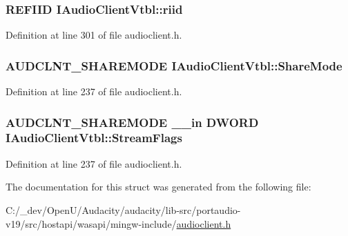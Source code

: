 \subsubsection[{\texorpdfstring{riid}{riid}}]{ {\bf R\+E\+F\+I\+ID} I\+Audio\+Client\+Vtbl\+::riid}\hypertarget{struct_i_audio_client_vtbl_a077ae9988553560212184f2b85aca501}{}\label{struct_i_audio_client_vtbl_a077ae9988553560212184f2b85aca501}


Definition at line 301 of file audioclient.\+h.

\subsubsection[{\texorpdfstring{Share\+Mode}{ShareMode}}]{ {\bf A\+U\+D\+C\+L\+N\+T\+\_\+\+S\+H\+A\+R\+E\+M\+O\+DE} I\+Audio\+Client\+Vtbl\+::\+Share\+Mode}\hypertarget{struct_i_audio_client_vtbl_aeb3c2e00a923b0d0f5abbfe34e069c1e}{}\label{struct_i_audio_client_vtbl_aeb3c2e00a923b0d0f5abbfe34e069c1e}


Definition at line 237 of file audioclient.\+h.

\subsubsection[{\texorpdfstring{Stream\+Flags}{StreamFlags}}]{ {\bf A\+U\+D\+C\+L\+N\+T\+\_\+\+S\+H\+A\+R\+E\+M\+O\+DE} {\bf \+\_\+\+\_\+in} {\bf D\+W\+O\+RD} I\+Audio\+Client\+Vtbl\+::\+Stream\+Flags}\hypertarget{struct_i_audio_client_vtbl_a4c09038199eeb68300b0a31bdcac8913}{}\label{struct_i_audio_client_vtbl_a4c09038199eeb68300b0a31bdcac8913}


Definition at line 237 of file audioclient.\+h.



The documentation for this struct was generated from the following file\+:\begin{DoxyCompactItemize}
\item 
C\+:/\+\_\+dev/\+Open\+U/\+Audacity/audacity/lib-\/src/portaudio-\/v19/src/hostapi/wasapi/mingw-\/include/\hyperlink{audioclient_8h}{audioclient.\+h}\end{DoxyCompactItemize}
